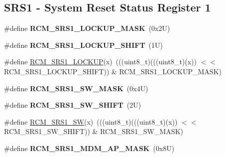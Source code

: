 \subsection*{S\+R\+S1 -\/ System Reset Status Register 1}
\begin{DoxyCompactItemize}
\item 
\mbox{\label{group___r_c_m___register___masks_ga4f7c4ce64c13c55fc0c7aaea3a702a03}} 
\#define {\bfseries R\+C\+M\+\_\+\+S\+R\+S1\+\_\+\+L\+O\+C\+K\+U\+P\+\_\+\+M\+A\+SK}~(0x2\+U)
\item 
\mbox{\label{group___r_c_m___register___masks_ga71f857503a2b2d2e0c30d4762e89a8d8}} 
\#define {\bfseries R\+C\+M\+\_\+\+S\+R\+S1\+\_\+\+L\+O\+C\+K\+U\+P\+\_\+\+S\+H\+I\+FT}~(1\+U)
\item 
\#define \mbox{\hyperlink{group___r_c_m___register___masks_ga3f79a81c77e80752d0fed127cee7eb3f}{R\+C\+M\+\_\+\+S\+R\+S1\+\_\+\+L\+O\+C\+K\+UP}}(x)~(((uint8\+\_\+t)(((uint8\+\_\+t)(x)) $<$$<$ R\+C\+M\+\_\+\+S\+R\+S1\+\_\+\+L\+O\+C\+K\+U\+P\+\_\+\+S\+H\+I\+FT)) \& R\+C\+M\+\_\+\+S\+R\+S1\+\_\+\+L\+O\+C\+K\+U\+P\+\_\+\+M\+A\+SK)
\item 
\mbox{\label{group___r_c_m___register___masks_ga72f541acd2a0992ad0d1d089c694ad5f}} 
\#define {\bfseries R\+C\+M\+\_\+\+S\+R\+S1\+\_\+\+S\+W\+\_\+\+M\+A\+SK}~(0x4\+U)
\item 
\mbox{\label{group___r_c_m___register___masks_ga7e554c1ae96dae684fbc81204283f86c}} 
\#define {\bfseries R\+C\+M\+\_\+\+S\+R\+S1\+\_\+\+S\+W\+\_\+\+S\+H\+I\+FT}~(2\+U)
\item 
\#define \mbox{\hyperlink{group___r_c_m___register___masks_ga36b91894a31fac3176c85c742e21fda3}{R\+C\+M\+\_\+\+S\+R\+S1\+\_\+\+SW}}(x)~(((uint8\+\_\+t)(((uint8\+\_\+t)(x)) $<$$<$ R\+C\+M\+\_\+\+S\+R\+S1\+\_\+\+S\+W\+\_\+\+S\+H\+I\+FT)) \& R\+C\+M\+\_\+\+S\+R\+S1\+\_\+\+S\+W\+\_\+\+M\+A\+SK)
\item 
\mbox{\label{group___r_c_m___register___masks_ga6af4d8ed2135b602de575373f22b1af8}} 
\#define {\bfseries R\+C\+M\+\_\+\+S\+R\+S1\+\_\+\+M\+D\+M\+\_\+\+A\+P\+\_\+\+M\+A\+SK}~(0x8\+U)
\item 
\mbox{\label{group___r_c_m___register___masks_ga91611da7546b27a939e92926f378229f}} 

\end{DoxyCompactItemize}
